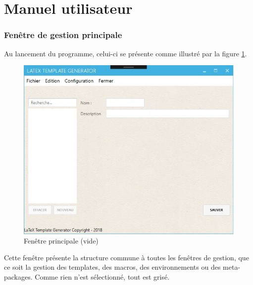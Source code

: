 \documentclass[a4paper, oneside]{article}
\date{\today}
\title{}
\begin{document}

\tableofcontents
\pagebreak

\part{Manuel utilisateur}
\section{Fenêtre de gestion principale}
\label{sec:orgbec1e98}

Au lancement du programme, celui-ci se présente comme illustré par la figure \ref{fig:org5289734}.

\begin{figure}[htbp]
\centering
\includegraphics[width=.9\linewidth]{../Images/accueil.jpg}
\caption{\label{fig:org5289734}
Fenêtre principale (vide)}
\end{figure}

Cette fenêtre présente la structure commune à toutes les fenêtres de gestion,
que ce soit la gestion des templates, des macros, des environnements ou des
meta-packages. Comme rien n'est sélectionné, tout est grisé.
\end{document}
